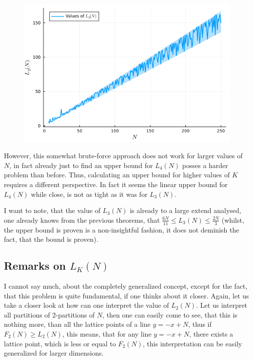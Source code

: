 \documentclass{article}
\begin{document}
\begin{figure}[h]
\centering
\includegraphics[scale=0.5]{images/L_3_plot}
\caption{}
\end{figure}

However, this somewhat brute-force approach does not work for larger values of \(N\), in fact already just to find an upper bound for \(L_4(N)\) posses a harder problem than before. Thus, calculating an upper bound for higher values of \(K\) requires a different perspective. In fact it seems the linear upper bound for \(L_4(N)\) while close, is not as tight as it was for \(L_3(N)\).

I want to note, that the value of \(L_3(N)\) is already to a large extend analysed, one already knows from the previous theorems, that \(\frac{6N}{11} \leq L_3(N) \leq \frac{2N}{3}\) (whilst, the upper bound is proven is a non-insightful fashion, it does not deminish the fact, that the bound is proven).

\subsection{Remarks on \(L_K(N)\)}

I cannot say much, about the completely generalized concept, except for the fact, that this problem is quite fundamental, if one thinks about it closer. Again, let us take a closer look at how can one interpret the value of \(L_2(N)\). Let us interpret all partitions of 2-partitions of \(N\), then one can easily come to see, that this is nothing more, than all the lattice points of a line \(y = -x + N\), thus if \(F_2(N) \geq L_2(N)\), this means, that for any line \(y = -x + N\), there exists a lattice point, which is less or equal to \(F_2(N)\), this interpretation can be easily generalized for larger dimensions.
\end{document}
